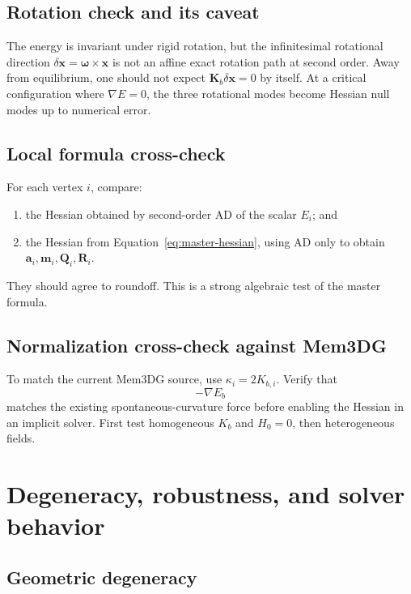 \documentclass[11pt]{article}
\newcommand{\grad}{\nabla}
\newcommand{\x}{\mathbf{x}}
\newcommand{\aV}{\mathbf{a}}
\newcommand{\mV}{\mathbf{m}}
\newcommand{\Q}{\mathbf{Q}}
\newcommand{\Mmat}{\mathbf{R}}
\newcommand{\Kmat}{\mathbf{K}}
\begin{document}
\subsection{Rotation check and its caveat}

The energy is invariant under rigid rotation, but the infinitesimal rotational direction $\delta\x=\bm{\omega}\times\x$ is not an affine exact rotation path at second order.  Away from equilibrium, one should not expect $\Kmat_b\delta\x=0$ by itself.  At a critical configuration where $\grad E=0$, the three rotational modes become Hessian null modes up to numerical error.

\subsection{Local formula cross-check}

For each vertex $i$, compare:
\begin{enumerate}
  \item the Hessian obtained by second-order AD of the scalar $E_i$; and
  \item the Hessian from Equation~\eqref{eq:master-hessian}, using AD only to obtain $\aV_i,\mV_i,\Q_i,\Mmat_i$.
\end{enumerate}
They should agree to roundoff.  This is a strong algebraic test of the master formula.

\subsection{Normalization cross-check against Mem3DG}

To match the current Mem3DG source, use $\kappa_i=2K_{b,i}$.  Verify that
\begin{equation}
  -\grad E_b
\end{equation}
matches the existing spontaneous-curvature force before enabling the Hessian in an implicit solver.  First test homogeneous $K_b$ and $H_0=0$, then heterogeneous fields.

\section{Degeneracy, robustness, and solver behavior}

\subsection{Geometric degeneracy}
\end{document}
